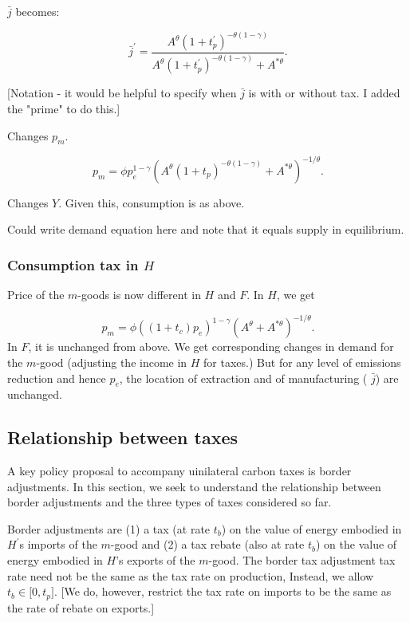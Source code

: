 \documentclass[notitlepage,12pt]{article}
\begin{document}
$\bar{j}$ becomes:

\begin{equation*}
\bar{j}^{\prime }=\frac{A^{\theta }\left( 1+t_{p}^{\prime }\right) ^{-\theta
\left( 1-\gamma \right) }}{A^{\theta }\left( 1+t_{p}^{\prime }\right)
^{-\theta \left( 1-\gamma \right) }+A^{\ast \theta }}.
\end{equation*}

[Notation - it would be helpful to specify when $\bar{j}$ is with or without
tax. I added the "prime" to do this.]

Changes $p_{m}$.

\begin{equation*}
p_{m}=\phi p_{e}^{1-\gamma }\left( A^{\theta }\left( 1+t_{p}\right)
^{-\theta \left( 1-\gamma \right) }+A^{\ast \theta }\right) ^{-1/\theta }.
\end{equation*}

Changes $Y$. Given this, consumption is as above.

Could write demand equation here and note that it equals supply in
equilibrium.

\subsubsection{Consumption tax in $H$}

Price of the $m$-goods is now different in $H$ and $F$. In $H$, we get

\begin{equation*}
p_{m}=\phi \left( \left( 1+t_{c}\right) p_{e}\right) ^{1-\gamma }\left(
A^{\theta }+A^{\ast \theta }\right) ^{-1/\theta }.
\end{equation*}%
In $F$, it is unchanged from above. We get corresponding changes in demand
for the $m$-good (adjusting the income in $H$ for taxes.) But for any level
of emissions reduction and hence $p_{e}$, the location of extraction and of
manufacturing ( $\bar{j}$) are unchanged.

\subsection{Relationship between taxes}

A key policy proposal to accompany uinilateral carbon taxes is border
adjustments. In this section, we seek to understand the relationship between
border adjustments and the three types of taxes considered so far. 

Border adjustments are (1) a tax (at rate $t_{b}$) on the value of energy
embodied in $H^{\prime }$s imports of the $m$-good and (2) a tax rebate
(also at rate $t_{b}$) on the value of energy embodied in $H$'s exports of
the $m$-good. The border tax adjustment tax rate need not be the same as the
tax rate on production, Instead, we allow $t_{b}\in \lbrack 0,t_{p}]$. [We
do, however, restrict the tax rate on imports to be the same as the rate of
rebate on exports.]
\end{document}
